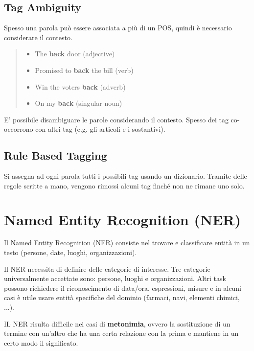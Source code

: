 \subsection*{Tag Ambiguity}
Spesso una parola può essere associata a più di un POS, quindi è necessario considerare il contesto.

\begin{quote}
  \bigskip
  \centering
  \begin{minipage}{0.8\linewidth}
    \begin{itemize}
      \item The \textbf{back} door \hfill{(adjective)}
      \item Promised to \textbf{back} the bill \hfill{(verb)}
      \item Win the voters \textbf{back} \hfill (adverb)
      \item On my \textbf{back} \hfill (singular noun)
    \end{itemize}
  \end{minipage}
  \bigskip
\end{quote}

E' possibile disambiguare le parole considerando il contesto. Spesso dei tag co-occorrono con altri tag (e.g. gli articoli e i sostantivi).

\subsection*{Rule Based Tagging}
Si assegna ad ogni parola tutti i possibili tag usando un dizionario.
Tramite delle regole scritte a mano, vengono rimossi alcuni tag finché non ne rimane uno solo.

\section{Named Entity Recognition (NER)}
Il Named Entity Recognition (NER) consiste nel trovare e classificare entità in un testo (persone, date, luoghi, organizzazioni).

Il NER necessita di definire delle categorie di interesse.
Tre categorie universalmente accettate sono: persone, luoghi e organizzazioni.
Altri task possono richiedere il riconoscimento di data/ora, espressioni, misure e in alcuni casi
è utile usare entità specifiche del dominio (farmaci, navi, elementi chimici, ...).

IL NER risulta difficile nei casi di \textbf{metonimia}, ovvero la sostituzione di un termine con un'altro
che ha una certa relazione con la prima e mantiene in un certo modo il significato.

